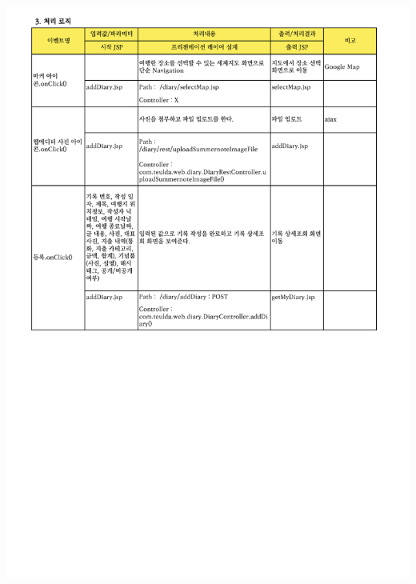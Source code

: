 {{{{{{{{{{{{{{{{{{{{{{{\includegraphics[width=20cm]{./Figure/Design/Display/diary/diary_05.pdf} \\
}}}}}}}}}}}}}}}}}}}}}}}
